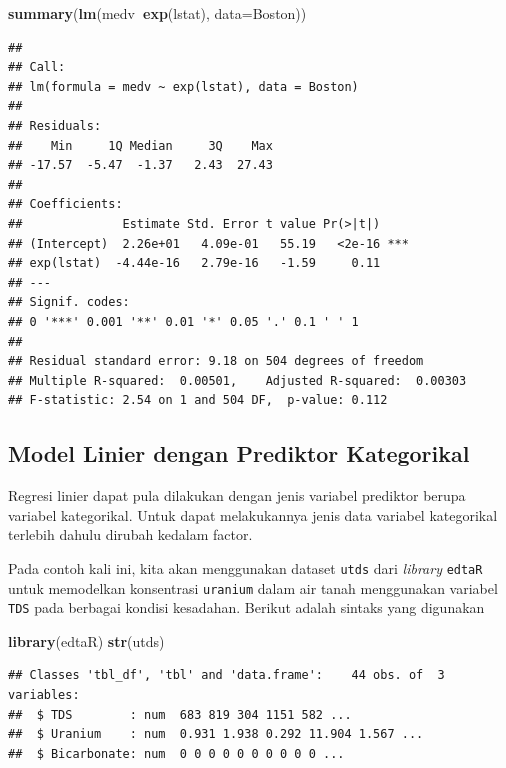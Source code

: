 \documentclass[]{book}
\newenvironment{Shaded}{\begin{snugshade}}{\end{snugshade}}
\newcommand{\DataTypeTok}[1]{\textcolor[rgb]{0.13,0.29,0.53}{#1}}
\newcommand{\KeywordTok}[1]{\textcolor[rgb]{0.13,0.29,0.53}{\textbf{#1}}}
\newcommand{\NormalTok}[1]{#1}
\newcommand{\OperatorTok}[1]{\textcolor[rgb]{0.81,0.36,0.00}{\textbf{#1}}}
\theoremstyle{definition}
\theoremstyle{definition}
\theoremstyle{definition}
\theoremstyle{remark}
\begin{document}
\begin{Shaded}
\begin{Highlighting}[]
\KeywordTok{summary}\NormalTok{(}\KeywordTok{lm}\NormalTok{(medv}\OperatorTok{~}\KeywordTok{exp}\NormalTok{(lstat), }\DataTypeTok{data=}\NormalTok{Boston))}
\end{Highlighting}
\end{Shaded}

\begin{verbatim}
## 
## Call:
## lm(formula = medv ~ exp(lstat), data = Boston)
## 
## Residuals:
##    Min     1Q Median     3Q    Max 
## -17.57  -5.47  -1.37   2.43  27.43 
## 
## Coefficients:
##              Estimate Std. Error t value Pr(>|t|)    
## (Intercept)  2.26e+01   4.09e-01   55.19   <2e-16 ***
## exp(lstat)  -4.44e-16   2.79e-16   -1.59     0.11    
## ---
## Signif. codes:  
## 0 '***' 0.001 '**' 0.01 '*' 0.05 '.' 0.1 ' ' 1
## 
## Residual standard error: 9.18 on 504 degrees of freedom
## Multiple R-squared:  0.00501,    Adjusted R-squared:  0.00303 
## F-statistic: 2.54 on 1 and 504 DF,  p-value: 0.112
\end{verbatim}

\hypertarget{model-linier-dengan-prediktor-kategorikal}{%
\subsection{Model Linier dengan Prediktor Kategorikal}\label{model-linier-dengan-prediktor-kategorikal}}

Regresi linier dapat pula dilakukan dengan jenis variabel prediktor berupa variabel kategorikal. Untuk dapat melakukannya jenis data variabel kategorikal terlebih dahulu dirubah kedalam factor.

Pada contoh kali ini, kita akan menggunakan dataset \texttt{utds} dari \emph{library} \texttt{edtaR} untuk memodelkan konsentrasi \texttt{uranium} dalam air tanah menggunakan variabel \texttt{TDS} pada berbagai kondisi kesadahan. Berikut adalah sintaks yang digunakan

\begin{Shaded}
\begin{Highlighting}[]
\KeywordTok{library}\NormalTok{(edtaR)}
\KeywordTok{str}\NormalTok{(utds)}
\end{Highlighting}
\end{Shaded}

\begin{verbatim}
## Classes 'tbl_df', 'tbl' and 'data.frame':    44 obs. of  3 variables:
##  $ TDS        : num  683 819 304 1151 582 ...
##  $ Uranium    : num  0.931 1.938 0.292 11.904 1.567 ...
##  $ Bicarbonate: num  0 0 0 0 0 0 0 0 0 0 ...
\end{verbatim}
\end{document}
